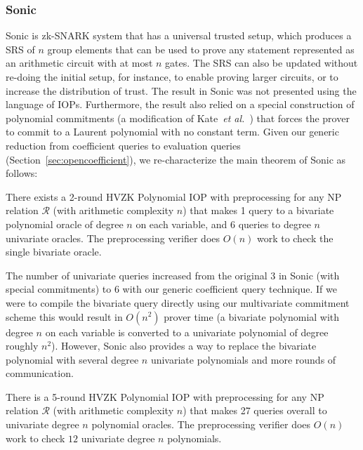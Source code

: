 \subsubsection{Sonic} 
\textsf{Sonic} is zk-SNARK system that has a universal trusted setup, which produces a SRS of $n$ group elements that can be used to prove any statement represented as an arithmetic circuit with at most $n$ gates. The SRS can also be updated without re-doing the initial setup, for instance, to enable proving larger circuits, or to increase the distribution of trust. The result in \textsf{Sonic} was not presented using the language of IOPs. Furthermore, the result also relied on a special construction of polynomial commitments (a modification of Kate~\emph{et al.}~\cite{AC:KatZavGol10}) that forces the prover to commit to a Laurent polynomial with no constant term. Given our generic reduction from coefficient queries to evaluation queries (Section~\ref{sec:opencoefficient}), we re-characterize the main theorem of \textsf{Sonic} as follows: 

\begin{theorem}
There exists a 2-round HVZK Polynomial IOP with preprocessing for any NP relation $\mathcal{R}$ (with arithmetic complexity $n$) that makes 1 query to a bivariate polynomial oracle of degree $n$ on each variable, and 6 queries to degree $n$ univariate oracles. The preprocessing verifier does $O(n)$ work to check the single bivariate oracle. 
\end{theorem}

The number of univariate queries increased from the original $3$ in \textsf{Sonic} (with special commitments) to $6$ with our generic coefficient query technique. 
If we were to compile the bivariate query directly using our multivariate commitment scheme this would result in $O(n^2)$ prover time (a bivariate polynomial with degree $n$ on each variable is converted to a univariate polynomial of degree roughly $n^2$). However, \textsf{Sonic} also provides a way to replace the bivariate polynomial with several degree $n$ univariate polynomials and more rounds of communication. 

\begin{theorem}\label{thm:sonic} 
There is a 5-round HVZK Polynomial IOP with preprocessing for any NP relation $\mathcal{R}$ (with arithmetic complexity $n$) that makes 27 queries overall to univariate degree $n$ polynomial oracles. The preprocessing verifier does $O(n)$ work to check $12$ univariate degree $n$ polynomials. 
\end{theorem}

